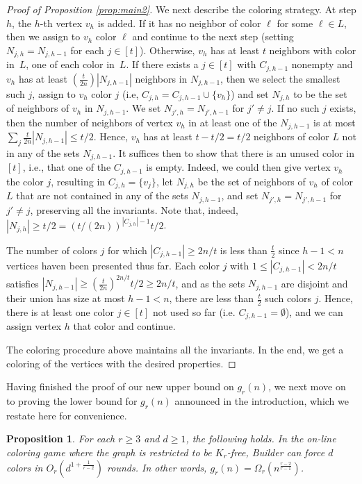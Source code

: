 \documentclass[10pt]{amsart}
\newtheorem{proposition}[theorem]{Proposition}
\theoremstyle{definition}
\begin{document}
\begin{proof}[Proof of Proposition \ref{prop:main2}]
We next describe the coloring strategy. At step $h$, the $h$-th vertex $v_h$ is added.
If it has no neighbor of color $\ell$ for some $\ell \in L$, then we
assign to $v_h$ color $\ell$ and continue to the next step (setting
$N_{j,h}=N_{j,h-1}$ for each $j \in [t]$). Otherwise, $v_h$ has at
least $t$ neighbors with color in~$L$, one of each color in~$L$. If there
exists a $j \in [t]$ with $C_{j,h-1}$ nonempty and $v_h$ has at least
$(\frac{t}{2n})|N_{j,h-1}|$ neighbors in $N_{j,h-1}$, then we select the smallest such $j$, assign
to $v_h$ color $j$ (i.e, $C_{j,h}=C_{j,h-1}\cup \{v_h\}$) and set $N_{j,h}$ to be the set of neighbors of
$v_h$ in $N_{j,h-1}$. We set $N_{j',h}=N_{j',h-1}$ for $j' \not = j$. If no
such $j$ exists, then the number of neighbors of vertex $v_h$ in at least one
of the $N_{j,h-1}$ is at most $\sum_{j} \frac{t}{2n}|N_{j,h-1}| \leq t/2$.
Hence, $v_h$ has at least $t-t/2=t/2$ neighbors of color $L$ not in any of the sets
$N_{j,h-1}$. It suffices then to show that there is an unused color in
$[t]$, i.e., that one of the $C_{j,h-1}$ is empty. Indeed, we could then give
vertex $v_h$ the color $j$, resulting in $C_{j,h}=\{v_j\}$, let $N_{j,h}$ be the set of neighbors of $v_h$ of color $L$
that are not contained in any of the sets $N_{j,h-1}$, and set $N_{j',h}=N_{j',h-1}$ for $j' \not = j$, preserving all the invariants. Note that, indeed, $|N_{j,h}| \geq t/2=(t/(2n))^{|C_{j,h}|-1} t/2$.

The
number of colors $j$ for which $|C_{j,h-1}| \geq 2n/t$ is less than
$\frac{t}{2}$ since  $h-1 < n$ vertices haven been presented thus far. Each color $j$
with $1 \leq |C_{j,h-1}| < 2n/t$ satisfies $|N_{j,h-1}| \geq
\left(\frac{t}{2n}\right)^{2n/t}t/2 \geq 2n/t$, and as the sets $N_{j,h-1}$
are disjoint and their union has size at most $h-1<n$, there are less than
$\frac{t}{2}$ such colors $j$. Hence, there is at least one color $j\in [t]$
not used so far (i.e. $C_{j,h-1}=\emptyset$), and we can assign vertex $h$ that color and continue. 

The coloring procedure above maintains all the invariants. In the end, we
get a coloring of the vertices with the desired properties. 
\end{proof}
Having finished the proof of our new upper bound on $g_r(n)$, we next move on to proving the lower bound for $g_r(n)$ announced in the introduction, which we restate here for convenience.
\begin{proposition}
    \label{prop:Kr-free-game}
    For each $r \geq 3$ and $d \geq 1$, the following holds. In the on-line coloring game where the graph is restricted to be $K_r$-free, Builder can force $d$ colors in $O_r(d^{1 + \frac{1}{r - 2}})$ rounds. In other words, $g_r(n) = \Omega_r(n^{\frac{r-2}{r-1}})$.
\end{proposition}
\end{document}
